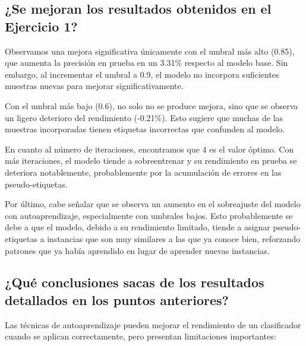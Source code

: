 \documentclass{article}
\begin{document}
\subsection{¿Se mejoran los resultados obtenidos en el Ejercicio 1?}
Observamos una mejora significativa únicamente con el umbral más alto (0.85), que aumenta la precisión en prueba en un 3.31\% respecto al modelo base. Sin embargo, al incrementar el umbral a 0.9, el modelo no incorpora suficientes muestras nuevas para mejorar significativamente. 

Con el umbral más bajo (0.6), no solo no se produce mejora, sino que se observa un ligero deterioro del rendimiento (-0.21\%). Esto sugiere que muchas de las muestras incorporadas tienen etiquetas incorrectas que confunden al modelo.

En cuanto al número de iteraciones, encontramos que 4 es el valor óptimo. Con más iteraciones, el modelo tiende a sobreentrenar y su rendimiento en prueba se deteriora notablemente, probablemente por la acumulación de errores en las pseudo-etiquetas.

Por último, cabe señalar que se observa un aumento en el sobreajuste del modelo con autoaprendizaje, especialmente con umbrales bajos. Esto probablemente se debe a que el modelo, debido a su rendimiento limitado, tiende a asignar pseudo-etiquetas a instancias que son muy similares a las que ya conoce bien, reforzando patrones que ya había aprendido en lugar de aprender nuevas instancias. 

\subsection{¿Qué conclusiones sacas de los resultados detallados en los puntos anteriores?}
Las técnicas de autoaprendizaje pueden mejorar el rendimiento de un clasificador cuando se aplican correctamente, pero presentan limitaciones importantes:
\end{document}
